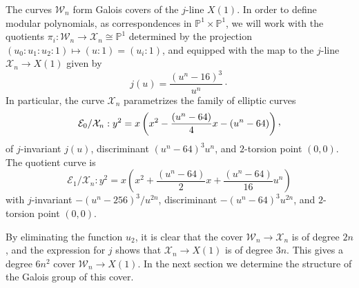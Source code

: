 \documentclass{amsart}
\newcommand{\cE}{\mathcal{E}}
\newcommand{\cX}{\mathcal{X}}
\newcommand{\cW}{\mathcal{W}}
\newcommand{\PP}{\mathbb{P}}
\newcommand{\isom}{\cong}
\newcommand{\uu}{\mathfrak{u}}
\newcommand{\ccomma}{\raisebox{0.4ex}{,}}
\begin{document}
The curves $\cW_n$ form Galois covers of the $j$-line $X(1)$.  In order to define modular
polynomials, as correspondences in $\PP^1 \times \PP^1$, we will work with the quotients
$\pi_i:\cW_n \to \cX_n \isom \PP^1$ determined by the projection $(u_0:u_1:u_2:1)
\mapsto (u:1) = (u_i:1)$, and equipped with the map to the $j$-line $\cX_n \to X(1)$
given by
$$
j(u) = \frac{(u^{n}-16)^3}{u^{n}}\cdot
$$
In particular, the curve $\cX_n$ parametrizes the family of elliptic curves
\begin{equation}
  \label{eqn:E0/Xn}
\cE_0/\cX_n: y^2 = x\left(x^2 - \frac{(u^n - 64)}{4}x - (u^n - 64)\right)\ccomma
\end{equation}
of $j$-invariant $j(u)$, discriminant $(u^n-64)^3u^{n}$, and $2$-torsion point $(0,0)$.
The quotient curve is
\begin{equation}
  \label{eqn:E1/Xn}
\cE_1/\cX_n: y^2 = x\left(x^2 + \frac{(u^n - 64)}{2}x + \frac{(u^n - 64)}{16}u^n\right)
\end{equation}
with $j$-invariant $-(u^n-256)^3/u^{2n}$, discriminant $-(u^n-64)^3u^{2n}$, and $2$-torsion
point $(0,0)$.

By eliminating the function $u_2$, it is clear that the cover $\cW_n \to \cX_n$ is of
degree $2n$, and the expression for $j$ shows that $\cX_n \to X(1)$ is of degree $3n$.
This gives a degree $6n^2$ cover $\cW_n \to X(1)$.  In the next section we determine
the structure of the Galois group of this cover. %
\end{document}
